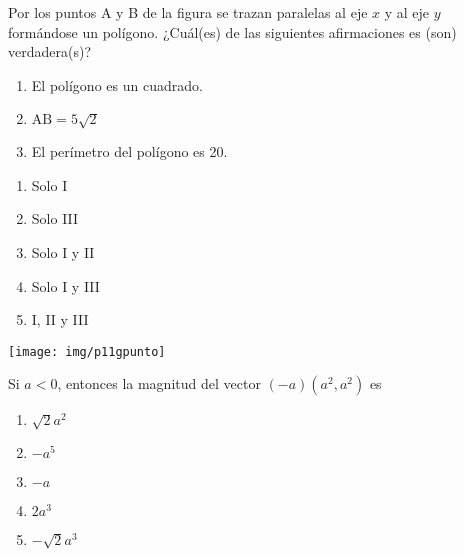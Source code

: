 \begin{enumerate}[label=\large{\textbf{\arabic*.}}, itemsep = 0.15cm, topsep = 0.5cm]
	
	\parbox{1\linewidth}{\item Por los puntos A y B de la figura se trazan paralelas al eje $x$ y al eje $y$ formándose un polígono. ¿Cuál(es) de las siguientes afirmaciones es (son) verdadera(s)?	
		\begin{enumerate}[label={\Roman*)}, itemsep = 0.5cm, topsep = 0.5cm, leftmargin = 2.4cm]
			\item El polígono es un cuadrado.
			\item $\mbox{AB}=5\sqrt{2}$
			\item El perímetro del polígono es 20.
		\end{enumerate}
		\begin{minipage}[t][3cm][t]{0.5\linewidth}
			\begin{enumerate}[label={\Alph*)}, itemsep = 0.15cm, topsep = 0.3cm]
				\item Solo I
				\item Solo III
				\item Solo I y II
				\item Solo I y III
				\item I, II y III
			\end{enumerate}
		\end{minipage}
		\begin{minipage}[t][1cm][t]{0.49\linewidth}
			\vspace{-1cm} %
			\hspace{1cm} %
			\texttt{[image: img/p11gpunto]} %
	\end{minipage}}
	
	\vspace*{1cm}
	
	\parbox{1\linewidth}{ \item Si $a < 0$, entonces la magnitud del vector $(-a)(a^2, a^2)$ es 
		\begin{enumerate}[label={\Alph*)}, itemsep = 0.15cm, topsep = 0.5cm]
			\item $\sqrt{2}a^2$
			\item $-a^5$
			\item $-a$
			\item $2a^3$
			\item $-\sqrt{2}a^3$
	\end{enumerate}}
	

\end{enumerate}
